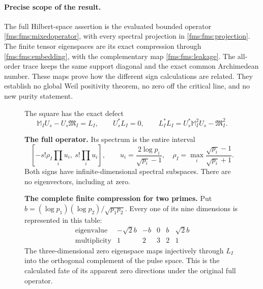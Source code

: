 \paragraph{Precise scope of the result.}
The full Hilbert-space assertion is the evaluated bounded operator
\eqref{fms:fms:mixedoperator}, with every spectral projection in
\eqref{fms:fms:projection}. The finite tensor eigenspaces are its exact
compression through \eqref{fms:fms:embedding}, with the complementary
map \eqref{fms:fms:leakage}. The all-order trace keeps the same support
diagonal and the exact common Archimedean number. These maps prove
how the different sign calculations are related. They establish no
global Weil positivity theorem, no zero off the critical line, and
no new purity statement.


\begin{figure}[p]
\centering
{}

\medskip
The square has the exact defect
\[
 \mathbb M_IU_s-U_s\mathfrak M_I=L_I,
 \qquad U_s^*L_I=0,
 \qquad L_I^*L_I=U_s^*\mathbb M_I^2U_s-\mathfrak M_I^2.
\]

\begin{minipage}{0.92\linewidth}
\textbf{The full operator.}
Its spectrum is the entire interval
\[
 [-s!\rho_I\prod_i u_i,\ s!\prod_i u_i],
 \qquad u_i=\frac{2\log p_i}{\sqrt{p_i}-1},\quad
 \rho_I=\max_i\frac{\sqrt{p_i}-1}{\sqrt{p_i}+1}.
\]
Both signs have infinite-dimensional spectral subspaces. There are
no eigenvectors, including at zero.

\medskip
\textbf{The complete finite compression for two primes.}
Put $b=(\log p_1)(\log p_2)/\sqrt{p_1p_2}$. Every one of
its nine dimensions is represented in this table:
\[
\begin{array}{c|rrrrr}
 \text{eigenvalue}&-\sqrt2b&-b&0&b&\sqrt2b\\\hline
 \text{multiplicity}&1&2&3&2&1
\end{array}
\]
The three-dimensional zero eigenspace maps injectively through
$L_I$ into the orthogonal complement of the pulse space. This is
the calculated fate of its apparent zero directions under the
original full operator.


\end{minipage}
\end{figure}
